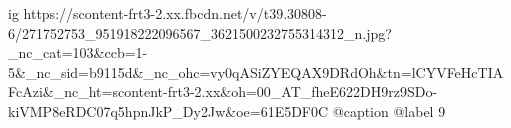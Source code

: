  
 
 
 
 

\ifcmt
  ig https://scontent-frt3-2.xx.fbcdn.net/v/t39.30808-6/271752753_951918222096567_3621500232755314312_n.jpg?_nc_cat=103&ccb=1-5&_nc_sid=b9115d&_nc_ohc=vy0qASiZYEQAX9DRdOh&tn=lCYVFeHcTIAFcAzi&_nc_ht=scontent-frt3-2.xx&oh=00_AT_fheE622DH9rz9SDo-kiVMP8eRDC07q5hpnJkP_Dy2Jw&oe=61E5DF0C
  @caption @label 9
\fi
